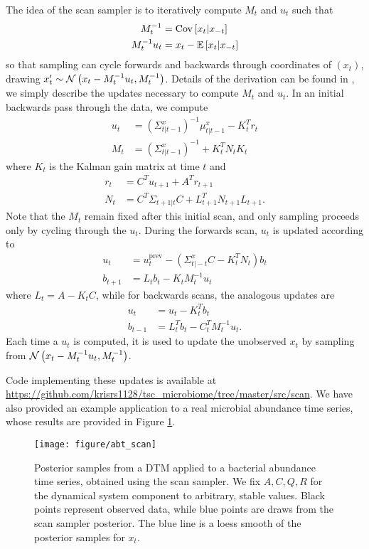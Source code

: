 \documentclass[14pt]{extreport}
\begin{document}
The idea of the scan sampler is to iteratively compute $M_t$ and $u_t$ such that
\begin{align*}
  M_t^{-1} &= \mathrm{Cov}\left[{x_t \vert x_{-t}}\right] \\
  M_t^{-1}u_t &= x_t - \mathbb{E}\left[{x_t \vert x_{-t}}\right]
\end{align*}
so that sampling can cycle forwards and backwards through coordinates of
$\left(x_t\right)$, drawing $x_t^{\prime} \sim \mathcal{N}\left(x_t - M_t^{-1}u_t,
M_t^{-1}\right)$. Details of the derivation can be found in \citep{de1997scan},
we simply describe the updates necessary to compute $M_t$ and $u_t$. In an
initial backwards pass through the data, we compute
\begin{align*}
  u_t &= \left(\Sigma_{t \vert t - 1}^{x}\right)^{-1}\mu_{t \vert t - 1}^{x} - K_t^{T}r_t \\
  M_t &= \left(\Sigma_{t \vert t - 1}^{x}\right)^{-1} + K_t^{T} N_t K_t
\end{align*}
where $K_t$ is the Kalman gain matrix at time $t$ and
\begin{align*}
  r_t &= C^T u_{t + 1} + A^{T}r_{t + 1} \\
  N_t &= C^{T} \Sigma_{t + 1 \vert t}C + L_{t + 1}^{T}N_{t + 1}L_{t + 1}.
\end{align*}
Note that the $M_t$ remain fixed after this initial scan, and only sampling
proceeds only by cycling through the $u_t$. During the forwards scan, $u_t$ is
updated according to
\begin{align*}
  u_t &= u_t^{\text{prev}} - \left(\Sigma_{t \vert -t}^{x} C - K_t^{T}N_t\right) b_t \\
  b_{t + 1} &= L_{t} b_t - K_t M_t^{-1}u_t
\end{align*}
where $L_t = A - K_t C$, while for backwards scans, the analogous updates are
\begin{align*}
  u_t &= u_t - K_t^{T} b_t \\
  b_{t - 1} &= L_t^T b_t - C_t^{T}M_t^{-1}u_t.
\end{align*}
Each time a $u_t$ is computed, it is used to update the unobserved $x_t$ by
sampling from $\mathcal{N}\left(x_t - M_t^{-1}u_t, M_t^{-1}\right)$.

Code implementing these updates is available at
\url{https://github.com/krisrs1128/tsc_microbiome/tree/master/src/scan}. We have
also provided an example application to a real microbial abundance time series,
whose results are provided in Figure \ref{fig:abt_scan}.

\begin{figure}
  \centering
  \texttt{[image: figure/abt\_scan]}
  \caption{Posterior samples from a DTM applied to a bacterial abundance time
    series, obtained using the scan sampler. We fix $A, C, Q, R$ for the
    dynamical system component to arbitrary, stable values. Black points
    represent observed data, while blue points are draws from the scan sampler
    posterior. The blue line is a loess smooth of the posterior samples for
    $x_t$.
    \label{fig:abt_scan}}
\end{figure}
\end{document}
